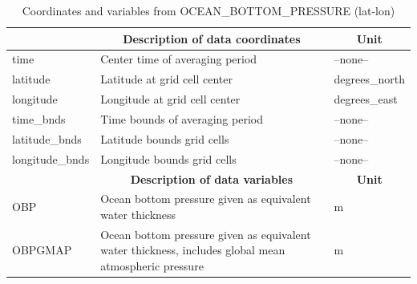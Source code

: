 \begin{longtable}{|m{}|m{}|m{}|}
\caption{Coordinates and variables from OCEAN\_BOTTOM\_PRESSURE (lat-lon)}
\label{tab:table-<xarray.Dataset> Size: 2MB
Dimensions:         (time: 1, latitude: 360, longitude: 720, nv: 2)
Coordinates:
  * time            (time) datetime64[ns] 8B 2017-12-29T12:00:00
  * latitude        (latitude) float32 1kB -89.75 -89.25 -88.75 ... 89.25 89.75
  * longitude       (longitude) float32 3kB -179.8 -179.2 -178.8 ... 179.2 179.8
    time_bnds       (time, nv) datetime64[ns] 16B ...
    latitude_bnds   (latitude, nv) float32 3kB ...
    longitude_bnds  (longitude, nv) float32 6kB ...
Dimensions without coordinates: nv
Data variables:
    OBP             (time, latitude, longitude) float32 1MB ...
    OBPGMAP         (time, latitude, longitude) float32 1MB ...
Attributes: (12/57)
    acknowledgement:              This research was carried out by the Jet Pr...
    author:                       Ian Fenty and Ou Wang
    cdm_data_type:                Grid
    comment:                      Fields provided on a regular lat-lon grid. ...
    Conventions:                  CF-1.8, ACDD-1.3
    coordinates_comment:          Note: the global 'coordinates' attribute de...
    ...                           ...
    time_coverage_duration:       P1D
    time_coverage_end:            2017-12-30T00:00:00
    time_coverage_resolution:     P1D
    time_coverage_start:          2017-12-29T00:00:00
    title:                        ECCO Ocean Bottom Pressure - Daily Mean 0.5...
    uuid:                         4bfbc7be-404b-11eb-b3f5-0cc47a3f7e1d-fields} \\ 
\hline \endfirsthead \endhead \endfoot \hline \endlastfoot
\rowcolor{lightgray} \multicolumn{1}{|c|}{\textbf{Coordinates}} & \multicolumn{1}{|c|}{\textbf{Description of data coordinates}} &  \multicolumn{1}{|c|}{\textbf{Unit}}\\ \hline
time &Center time of averaging period &--none--  \\ \hline
latitude &Latitude at grid cell center &degrees\_north  \\ \hline
longitude &Longitude at grid cell center &degrees\_east  \\ \hline
time\_bnds &Time bounds of averaging period &--none--  \\ \hline
latitude\_bnds &Latitude bounds grid cells &--none--  \\ \hline
longitude\_bnds &Longitude bounds grid cells &--none--  \\ \hline
\rowcolor{lightgray} \multicolumn{1}{|c|}{\textbf{Variables}} & \multicolumn{1}{|c|}{\textbf{Description of data variables}} &  \multicolumn{1}{|c|}{\textbf{Unit}}\\ \hline
OBP &Ocean bottom pressure given as equivalent water thickness &m  \\ \hline
OBPGMAP &Ocean bottom pressure given as equivalent water thickness, includes global mean atmospheric pressure &m  \\ \hline
\end{longtable}

